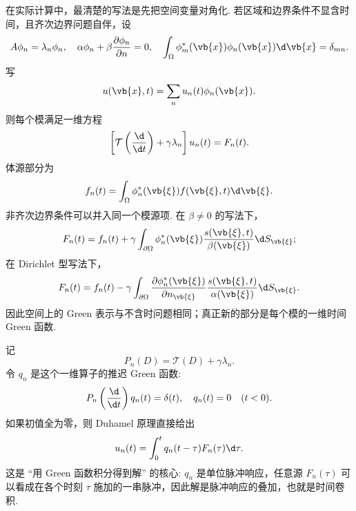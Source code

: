 在实际计算中，最清楚的写法是先把空间变量对角化. 若区域和边界条件不显含时间，且齐次边界问题自伴，设
\begin{equation*}
	A\phi_n=\lambda_n\phi_n,
	\quad
	\alpha\phi_n+\beta\frac{\partial\phi_n}{\partial n}=0,
	\quad
	\int_\Omega\phi_m^*(\vb{x})\phi_n(\vb{x})\d\vb{x}=\delta_{mn}.
\end{equation*}
写
\begin{equation*}
	u(\vb{x},t)=\sum_nu_n(t)\phi_n(\vb{x}).
\end{equation*}
则每个模满足一维方程
\begin{equation*}
	\left[\mathcal{T}\left(\frac{\d}{\d t}\right)+\gamma\lambda_n\right]u_n(t)=F_n(t).
\end{equation*}
体源部分为
\begin{equation*}
	f_n(t)=\int_\Omega\phi_n^*(\vb{\xi})f(\vb{\xi},t)\d\vb{\xi}.
\end{equation*}
非齐次边界条件可以并入同一个模源项. 在 $\beta\neq0$ 的写法下，
\begin{equation*}
	F_n(t)=f_n(t)+\gamma\int_{\partial\Omega}\phi_n^*(\vb{\xi})
	\frac{s(\vb{\xi},t)}{\beta(\vb{\xi})}\d S_{\vb{\xi}};
\end{equation*}
在 Dirichlet 型写法下，
\begin{equation*}
	F_n(t)=f_n(t)-\gamma\int_{\partial\Omega}
	\frac{\partial\phi_n^*(\vb{\xi})}{\partial n_{\vb{\xi}}}
	\frac{s(\vb{\xi},t)}{\alpha(\vb{\xi})}\d S_{\vb{\xi}}.
\end{equation*}
因此空间上的 Green 表示与不含时问题相同；真正新的部分是每个模的一维时间 Green 函数.

记
\begin{equation*}
	P_n(D)=\mathcal{T}(D)+\gamma\lambda_n.
\end{equation*}
令 $q_n$ 是这个一维算子的推迟 Green 函数:
\begin{equation*}
	P_n\left(\frac{\d}{\d t}\right)q_n(t)=\delta(t),
	\quad q_n(t)=0\quad(t<0).
\end{equation*}
如果初值全为零，则 Duhamel 原理直接给出
\begin{equation*}
	u_n(t)=\int_0^tq_n(t-\tau)F_n(\tau)\d\tau.
\end{equation*}
这是 ``用 Green 函数积分得到解'' 的核心: $q_n$ 是单位脉冲响应，任意源 $F_n(\tau)$ 可以看成在各个时刻 $\tau$ 施加的一串脉冲，因此解是脉冲响应的叠加，也就是时间卷积.

